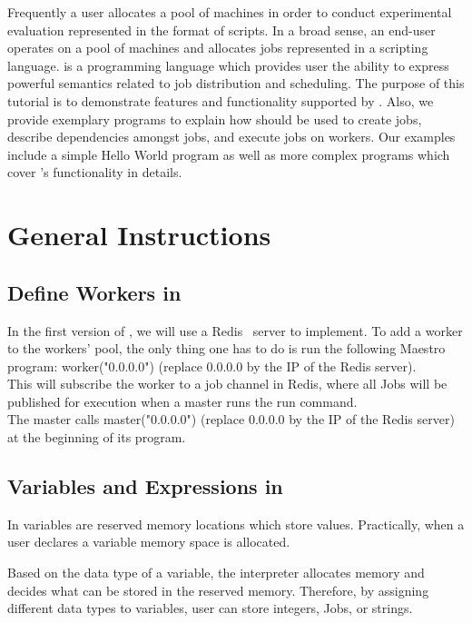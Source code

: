
Frequently a user allocates a pool of machines in order to conduct experimental
evaluation represented in the format of scripts. In a broad sense, an end-user
operates on a pool of machines and allocates jobs represented in a scripting
language. \lang{} is a programming language which provides user the ability
to express powerful semantics related to job distribution and scheduling.
The purpose of this tutorial is to demonstrate features and functionality 
supported by \lang{}. Also, we provide exemplary programs  to
explain how \lang{}  should be used to create jobs, describe dependencies amongst jobs,
and execute jobs on workers. Our examples include a simple Hello World program as well as
more complex programs which cover \lang{}'s functionality in details.


\section{General Instructions}
\label{sect:general}

\subsection*{Define Workers in \lang{}}
In the first version of \lang{}, we will use a Redis~\cite{redis} server to
implement. To add a worker to the workers' pool, the only thing one has to do
is run the following Maestro program: worker("0.0.0.0") (replace 0.0.0.0 by
the IP of the Redis server).\\
This will subscribe the worker to a job channel in Redis, where all Jobs will
be published for execution when a master runs the run command.\\
The master calls master("0.0.0.0") (replace 0.0.0.0 by the IP of the Redis server)
at the beginning of its program.

\subsection*{Variables and Expressions in \lang{}}
In \lang{} variables are reserved memory locations which store values.
Practically, when a user declares a variable memory space is allocated.

Based on the data type of a variable, the interpreter allocates memory
and decides what can be stored in the reserved memory. Therefore, by
assigning different data types to variables, user can store integers, Jobs,
or strings.


